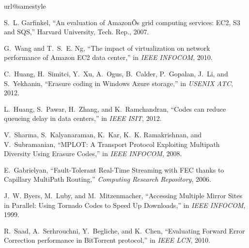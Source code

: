 \documentclass[journal]{IEEEtran}
\begin{document}

\begin{thebibliography}{10}
\providecommand{\url}[1]{#1}
\csname url@samestyle\endcsname
\providecommand{\newblock}{\relax}
\providecommand{\bibinfo}[2]{#2}
\providecommand{\BIBentrySTDinterwordspacing}{\spaceskip=0pt\relax}
\providecommand{\BIBentryALTinterwordstretchfactor}{4}
\providecommand{\BIBentryALTinterwordspacing}{\spaceskip=\fontdimen2\font plus
\BIBentryALTinterwordstretchfactor\fontdimen3\font minus
  \fontdimen4\font\relax}
\providecommand{\BIBforeignlanguage}[2]{{\expandafter\ifx\csname l@#1\endcsname\relax
\typeout{** WARNING: IEEEtran.bst: No hyphenation pattern has been}\typeout{** loaded for the language `#1'. Using the pattern for}\typeout{** the default language instead.}\else
\language=\csname l@#1\endcsname
\fi
#2}}
\providecommand{\BIBdecl}{\relax}
\BIBdecl

S.~L. Garfinkel, ``An evaluation of {AmazonÕs} grid computing services: {EC2},
  {S3} and {SQS},'' Harvard University, Tech. Rep., 2007.

G.~Wang and T.~S.~E. Ng, ``The impact of virtualization on network performance
  of {Amazon EC2} data center,'' in \emph{IEEE INFOCOM}, 2010.

C.~Huang, H.~Simitci, Y.~Xu, A.~Ogus, B.~Calder, P.~Gopalan, J.~Li, and
  S.~Yekhanin, ``{Erasure coding in Windows Azure storage},'' in \emph{USENIX
  ATC}, 2012.

L.~Huang, S.~Pawar, H.~Zhang, and K.~Ramchandran, ``Codes can reduce queueing
  delay in data centers,'' in \emph{IEEE ISIT}, 2012.

V.~Sharma, S.~Kalyanaraman, K.~Kar, K.~K. Ramakrishnan, and V.~Subramanian,
  ``{MPLOT: A Transport Protocol Exploiting Multipath Diversity Using Erasure
  Codes},'' in \emph{IEEE INFOCOM}, 2008.

E.~Gabrielyan, ``{Fault-Tolerant Real-Time Streaming with FEC thanks to
  Capillary MultiPath Routing},'' \emph{Computing Research Repository}, 2006.

J.~W. Byers, M.~Luby, and M.~Mitzenmacher, ``{Accessing Multiple Mirror Sites
  in Parallel: Using Tornado Codes to Speed Up Downloads},'' in \emph{IEEE
  INFOCOM}, 1999.

R.~Saad, A.~Serhrouchni, Y.~Begliche, and K.~Chen, ``{Evaluating Forward Error
  Correction performance in BitTorrent protocol},'' in \emph{IEEE LCN}, 2010.


\end{thebibliography}
\end{document}
